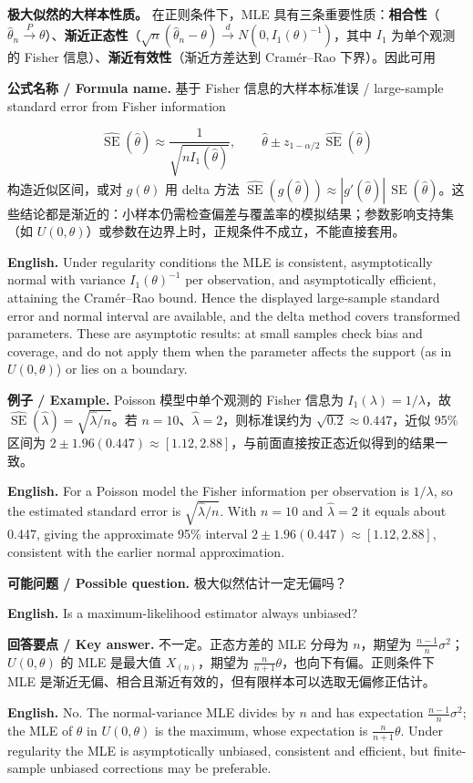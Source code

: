 \documentclass[UTF8,11pt,a4paper]{ctexart}
\newcommand{\EN}[1]{\par\noindent\textbf{English.} #1\par}
\newcommand{\FORMULA}[2]{\par\noindent\textbf{公式名称 / Formula name.} #1 / #2\par}
\newcommand{\EX}[2]{\par\noindent\textbf{例子 / Example.} #1\par\EN{#2}}
\newcommand{\ASK}[4]{\par\noindent\textbf{可能问题 / Possible question.} #1\par\EN{#2}\noindent\textbf{回答要点 / Key answer.} #3\par\EN{#4}\medskip}
\begin{document}
\noindent\textbf{极大似然的大样本性质。} 在正则条件下，MLE 具有三条重要性质：\textbf{相合性}（$\widehat\theta_n\xrightarrow{P}\theta$）、\textbf{渐近正态性}（$\sqrt n(\widehat\theta_n-\theta)\xrightarrow{\ d\ }N(0,I_1(\theta)^{-1})$，其中 $I_1$ 为单个观测的 Fisher 信息）、\textbf{渐近有效性}（渐近方差达到 Cramér--Rao 下界）。因此可用
\FORMULA{基于 Fisher 信息的大样本标准误}{large-sample standard error from Fisher information}
\[
\widehat{\operatorname{SE}}(\widehat\theta)\approx\frac{1}{\sqrt{nI_1(\widehat\theta)}},
\qquad
\widehat\theta\pm z_{1-\alpha/2}\,\widehat{\operatorname{SE}}(\widehat\theta)
\]
构造近似区间，或对 $g(\theta)$ 用 delta 方法 $\widehat{\operatorname{SE}}(g(\widehat\theta))\approx|g'(\widehat\theta)|\,\widehat{\operatorname{SE}}(\widehat\theta)$。这些结论都是渐近的：小样本仍需检查偏差与覆盖率的模拟结果；参数影响支持集（如 $U(0,\theta)$）或参数在边界上时，正规条件不成立，不能直接套用。
\EN{Under regularity conditions the MLE is consistent, asymptotically normal with variance $I_1(\theta)^{-1}$ per observation, and asymptotically efficient, attaining the Cramér--Rao bound. Hence the displayed large-sample standard error and normal interval are available, and the delta method covers transformed parameters. These are asymptotic results: at small samples check bias and coverage, and do not apply them when the parameter affects the support (as in $U(0,\theta)$) or lies on a boundary.}

\EX{Poisson 模型中单个观测的 Fisher 信息为 $I_1(\lambda)=1/\lambda$，故 $\widehat{\operatorname{SE}}(\widehat\lambda)=\sqrt{\widehat\lambda/n}$。若 $n=10$、$\widehat\lambda=2$，则标准误约为 $\sqrt{0.2}\approx0.447$，近似 95\% 区间为 $2\pm1.96(0.447)\approx[1.12,2.88]$，与前面直接按正态近似得到的结果一致。}{For a Poisson model the Fisher information per observation is $1/\lambda$, so the estimated standard error is $\sqrt{\widehat\lambda/n}$. With $n=10$ and $\widehat\lambda=2$ it equals about 0.447, giving the approximate 95\% interval $2\pm1.96(0.447)\approx[1.12,2.88]$, consistent with the earlier normal approximation.}

\ASK{极大似然估计一定无偏吗？}{Is a maximum-likelihood estimator always unbiased?}{不一定。正态方差的 MLE 分母为 $n$，期望为 $\frac{n-1}{n}\sigma^2$；$U(0,\theta)$ 的 MLE 是最大值 $X_{(n)}$，期望为 $\frac{n}{n+1}\theta$，也向下有偏。正则条件下 MLE 是渐近无偏、相合且渐近有效的，但有限样本可以选取无偏修正估计。}{No. The normal-variance MLE divides by $n$ and has expectation $\frac{n-1}{n}\sigma^2$; the MLE of $\theta$ in $U(0,\theta)$ is the maximum, whose expectation is $\frac{n}{n+1}\theta$. Under regularity the MLE is asymptotically unbiased, consistent and efficient, but finite-sample unbiased corrections may be preferable.}
\end{document}
